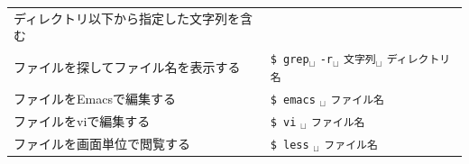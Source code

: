 \documentclass{jarticle}
\begin{document}
\begin{table}[htbp]
\begin{center}
\begin{tabular}{ll}
      ディレクトリ以下から指定した文字列を含む\\
      ファイルを探してファイル名を表示する &
	 \verb|$ grep|$_\sqcup$ \verb|-r|$_\sqcup$ \verb|文字列|$_\sqcup$ \verb|ディレクトリ名| \\ \midrule
      ファイルをEmacsで編集する&
	  \verb|$ emacs| $_\sqcup$ \verb|ファイル名 | \\ \midrule
      ファイルをviで編集する&
	  \verb|$ vi| $_\sqcup$ \verb|ファイル名 | \\ \midrule
      ファイルを画面単位で閲覧する&
	  \verb|$ less| $_\sqcup$ \verb|ファイル名 | \\ \midrule

     \end{tabular}
  \end{center}
\end{table}



	  
\end{document}
